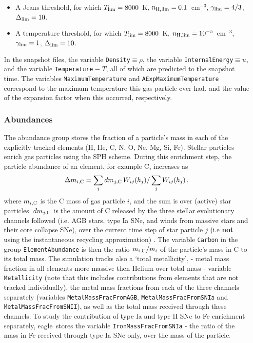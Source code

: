 \documentclass[10pt, a4paper]{article}
\newcommand{\eagle}{{\sc eagle}}
\begin{document}
\begin{itemize} 

\item A Jeans threshold, for which $T_{\rm lim}=8000$~K, $n_{\rm H,
lim}=0.1$~cm$^{-3}$, $\gamma_{\rm lim}=4/3$, $\Delta_{\rm lim}=10$.

\item A temperature threshold, for which $T_{\rm lim}=8000$~K, $n_{\rm H,
lim}=10^{-5}$~cm$^{-3}$, $\gamma_{\rm lim}=1$, $\Delta_{\rm lim}=10$.

\end{itemize}

In the snapshot files, the variable \texttt{Density}$\equiv \rho$, the variable
\texttt{InternalEnergy}$\equiv u$, and the variable \texttt{Temperature}$\equiv
T$, all of which are predicted to the snapshot time. The variables
\texttt{MaximumTemperature} and \texttt{AExpMaximumTemperature} correspond to
the maximum temperature this gas particle ever had, and the value of the
expansion factor when this occurred, respectively. 

\subsubsection{Abundances} \label{sect:abundances} The abundance group stores
the fraction of a particle's mass in each of the explicitly tracked elements
(H, He, C, N, O, Ne, Mg, Si, Fe). Stellar particles enrich gas particles using
the SPH scheme. During this enrichment step, the particle abundance of an
element, for example C, increases as \begin{equation} \Delta m_{i, {\rm C}} =
\sum_j dm_{j, {\rm C}}\,W_{ij}(h_j)/ \sum_j W_{ij}(h_j)\,, \end{equation} where
$m_{i, {\rm C}}$ is the C mass of gas particle $i$, and the sum is over
(active) star particles. $dm_{j, {\rm C}}$ is the amount of C released by the
three stellar evolutionary channels followed (i.e. AGB stars, type Ia SNe, and
winds from massive stars and their core collapse SNe), over the current time
step of star particle $j$ (i.e {\bf not} using the instantaneous recycling
approximation) .  The variable \texttt{Carbon} in the group
\texttt{ElementAbundance} is then the ratio $m_{i, {\rm C}}/m_i$ of the
particle's mass in C to its total mass. The simulation tracks also a \lq total
metallicity\rq,  - metal mass fraction in all elements more massive then Helium
over total mass - variable \texttt{Metallicity} (note that this includes
contributions from elements that are not tracked individually), the metal mass
fractions from each of the three channels separately (variables
\texttt{MetalMassFracFromAGB}, \texttt{MetalMassFracFromSNIa} and
\texttt{MetalMassFracFromSNII}), as well as the total mass received through
these channels. To study the contribution of type Ia and type II SNe to Fe
enrichment separately, \eagle\ stores the variable
\texttt{IronMassFracFromSNIa} - the ratio of the mass in Fe received through
type Ia SNe only, over the mass of the particle.
\end{document}
